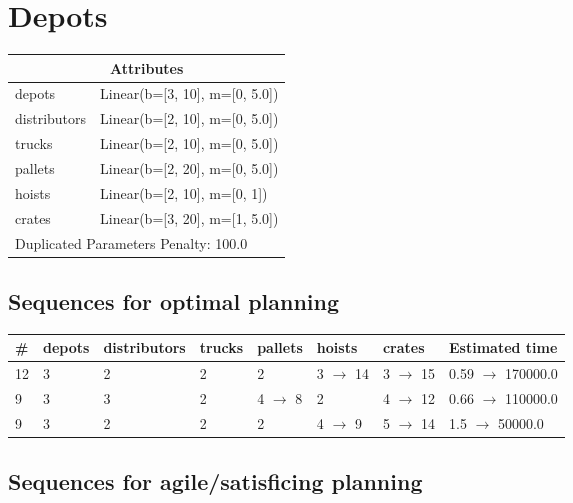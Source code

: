 \documentclass{article}
\begin{document}
                            \newpage \section{Depots}
                    \begin{center}
                    \begin{tabular}{@{}p{}p{}@{}}
                    \multicolumn{2}{c}{\bf \large Attributes}\\\midrule
                    depots & Linear(b=[3, 10], m=[0, 5.0])\\
distributors & Linear(b=[2, 10], m=[0, 5.0])\\
trucks & Linear(b=[2, 10], m=[0, 5.0])\\
pallets & Linear(b=[2, 20], m=[0, 5.0])\\
hoists & Linear(b=[2, 10], m=[0, 1])\\
crates & Linear(b=[3, 20], m=[1, 5.0]) \\\midrule
                    \multicolumn{2}{l}{Duplicated Parameters Penalty: 100.0}
                    \end{tabular}
                    \end{center}
                
                            \subsection*{Sequences for optimal planning}

                            \begin{center}
                            \begin{tabular}{@{}l|l|l|l|l|l|l|l@{}}
                            \# & depots & distributors & trucks & pallets & hoists & crates & Estimated time\\\midrule
                            12&3&2&2&2&3 $\rightarrow$ 14&3 $\rightarrow$ 15&0.59 $\rightarrow$ 170000.0\\
9&3&3&2&4 $\rightarrow$ 8&2&4 $\rightarrow$ 12&0.66 $\rightarrow$ 110000.0\\
9&3&2&2&2&4 $\rightarrow$ 9&5 $\rightarrow$ 14&1.5 $\rightarrow$ 50000.0
                            \end{tabular}
                            \end{center}
                    
                         \subsection*{Sequences for agile/satisficing planning}
\end{document}
